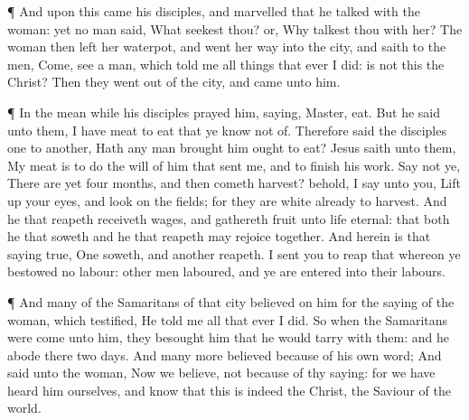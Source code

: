  ¶ And upon this came his disciples, and marvelled that he
talked with the woman: yet no man said, What seekest thou? or, Why
talkest thou with her?  The woman then left her waterpot,
and went her way into the city, and saith to the men, 
Come, see a man, which told me all things that ever I did: is not this
the Christ?  Then they went out of the city, and came unto
him.

 ¶ In the mean while his disciples prayed him, saying,
Master, eat.  But he said unto them, I have meat to eat
that ye know not of.  Therefore said the disciples one to
another, Hath any man brought him ought to eat?  Jesus
saith unto them, My meat is to do the will of him that sent me, and to
finish his work.  Say not ye, There are yet four months,
and then cometh harvest? behold, I say unto you, Lift up your eyes, and
look on the fields; for they are white already to harvest. 
And he that reapeth receiveth wages, and gathereth fruit unto life
eternal: that both he that soweth and he that reapeth may rejoice
together.  And herein is that saying true, One soweth, and
another reapeth.  I sent you to reap that whereon ye
bestowed no labour: other men laboured, and ye are entered into their
labours.

 ¶ And many of the Samaritans of that city believed on him
for the saying of the woman, which testified, He told me all that ever I
did.  So when the Samaritans were come unto him, they
besought him that he would tarry with them: and he abode there two days.
 And many more believed because of his own word;
 And said unto the woman, Now we believe, not because of
thy saying: for we have heard him ourselves, and know that this is
indeed the Christ, the Saviour of the world.


